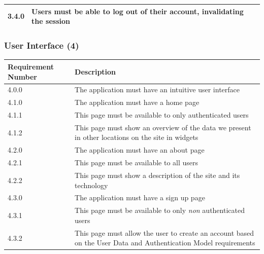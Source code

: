 \documentclass[12pt]{article}
\begin{document}
\begin{tabular}{|l|p{8cm}|}
    \hline\hline
    3.4.0              & Users must be able to log out of their account, invalidating the session                             \\
    \hline
\end{tabular}

\subsubsection{User Interface (4)}

\setlength{\tabcolsep}{1cm}
\begin{tabular}{|l|p{8cm}|}
    \hline
    Requirement Number & Description                                                                                                     \\

    \hline\hline
    4.0.0              & The application must have an intuitive user interface                                                           \\

    \hline\hline
    4.1.0              & The application must have a home page                                                                           \\
    \hline
    4.1.1              & This page must be available to only authenticated users                                                         \\
    \hline
    4.1.2              & This page must show an overview of the data we present in other locations on the site in widgets                \\

    \hline\hline
    4.2.0              & The application must have an about page                                                                         \\
    \hline
    4.2.1              & This page must be available to all users                                                                        \\
    \hline
    4.2.2              & This page must show a description of the site and its technology                                                \\
    \hline

    \hline\hline
    4.3.0              & The application must have a sign up page                                                                        \\
    \hline
    4.3.1              & This page must be available to only \textit{non} authenticated users                                            \\
    \hline
    4.3.2              & This page must allow the user to create an account based on the User Data and Authentication Model requirements \\
    \hline


\end{tabular}
\end{document}
